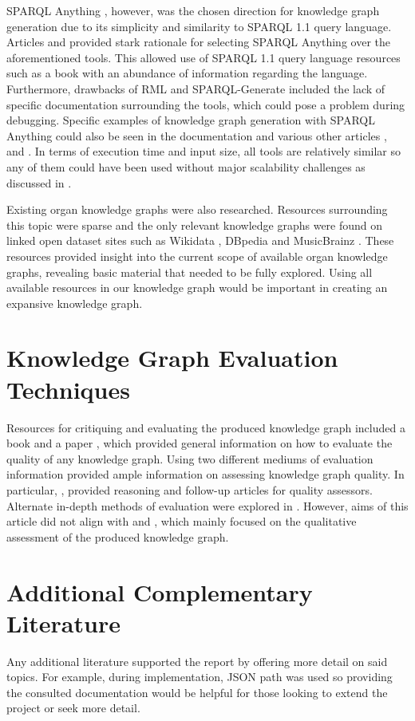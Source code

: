 SPARQL Anything \cite{sparqlanythinggithub}, however, was the chosen direction for knowledge graph generation due to its simplicity and similarity to SPARQL 1.1 query language. Articles \cite{sparqlanything} and \cite{asprino2023knowledge} provided stark rationale for selecting SPARQL Anything over the aforementioned tools. This allowed use of SPARQL 1.1 query language resources such as a book \cite{sparlbook} with an abundance of information regarding the language. Furthermore, drawbacks of RML and SPARQL-Generate included the lack of specific documentation surrounding the tools, which could pose a problem during debugging. Specific examples of knowledge graph generation with SPARQL Anything could also be seen in the documentation \cite{sparqlanythinggithub} and various other articles \cite{sparqlanything}, \cite{asprino2023knowledge} and \cite{rattaknowledge}. In terms of execution time and input size, all tools are relatively similar so any of them could have been used without major scalability challenges as discussed in \cite{sparqlanything}. 

Existing organ knowledge graphs were also researched. Resources surrounding this topic were sparse and the only relevant knowledge graphs were found on linked open dataset sites such as Wikidata \cite{organwikidata}, DBpedia \cite{organdbpedia} and MusicBrainz \cite{organmusicbrainz}. These resources provided insight into the current scope of available organ knowledge graphs, revealing basic material that needed to be fully explored. Using all available resources in our knowledge graph would be important in creating an expansive knowledge graph.

\section{Knowledge Graph Evaluation Techniques}
\hspace{0.5cm} Resources for critiquing and evaluating the produced knowledge graph included a book \cite{knowledgegraphevaulationbook} and a paper \cite{evaluationpaper}, which provided general information on how to evaluate the quality of any knowledge graph. Using two different mediums of evaluation information provided ample information on assessing knowledge graph quality. In particular, \cite{evaluationpaper}, provided reasoning and follow-up articles for quality assessors. Alternate in-depth methods of evaluation were explored in \cite{gao2019efficient}. However, aims of this article did not align with \cite{knowledgegraphevaulationbook} and \cite{evaluationpaper}, which mainly focused on the qualitative assessment of the produced knowledge graph. 

\section{Additional Complementary Literature}
\hspace{0.5cm} Any additional literature supported the report by offering more detail on said topics. For example, during implementation, JSON path was used so providing the consulted documentation \cite{jsonpath} would be helpful for those looking to extend the project or seek more detail. 
